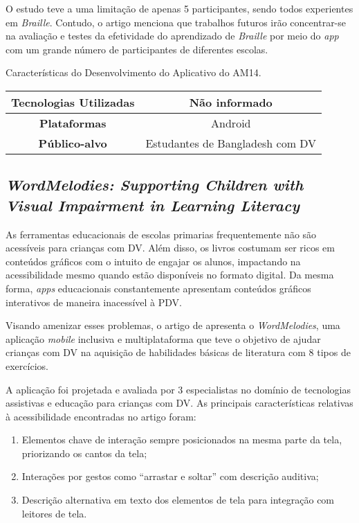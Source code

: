 O estudo teve a uma limitação de apenas 5 participantes, sendo todos experientes em \emph{Braille}.
Contudo, o artigo menciona que trabalhos futuros irão concentrar-se na avaliação e testes da efetividade do
aprendizado de \emph{Braille} por meio do \emph{app} com um grande número de participantes de diferentes escolas.

\begin{quadro}[htb!]
  \caption{\label{qua-car-am14}Características do Desenvolvimento do Aplicativo do AM14.}
  \begin{tabular}{|c|c|}
    \hline
    \textbf{Tecnologias Utilizadas} & Não informado                   \\ \hline
    \textbf{Plataformas}            & Android                         \\ \hline
    \textbf{Público-alvo}           & Estudantes de Bangladesh com DV \\
    \hline
  \end{tabular}
\end{quadro}

\newpage

\subsection{\emph{WordMelodies: Supporting Children with Visual Impairment in Learning Literacy}}

As ferramentas educacionais de escolas primarias frequentemente não são acessíveis para crianças com DV\@.
Além disso, os livros costumam ser ricos em conteúdos gráficos com o intuito de engajar os alunos, impactando na acessibilidade mesmo quando estão disponíveis no formato digital.
Da mesma forma, \emph{apps} educacionais constantemente apresentam conteúdos gráficos interativos de maneira inacessível à PDV\@.

Visando amenizar esses problemas, o artigo de  apresenta o \emph{WordMelodies}, uma aplicação \emph{mobile}
inclusiva e multiplataforma que teve o objetivo de ajudar crianças com DV na aquisição de habilidades básicas de literatura com 8
tipos de exercícios.

A aplicação foi projetada e avaliada por 3 especialistas no domínio de tecnologias assistivas e educação
para crianças com DV\@. As principais características relativas à acessibilidade encontradas no artigo foram:

\begin{enumerate}
  \item Elementos chave de interação sempre posicionados na mesma parte da tela, priorizando os cantos da tela;
  \item Interações por gestos como ``arrastar e soltar'' com descrição auditiva;
  \item Descrição alternativa em texto dos elementos de tela para integração com leitores de tela.
\end{enumerate}


